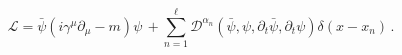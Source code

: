 \begin{equation}
\mathcal{L}=\bar{\psi}(i\gamma ^{\mu }\partial _{\mu }-m)\psi
\,+\sum_{n=1}^{\ell }\mathcal{D}^{\alpha _{n}}(\bar{\psi},\psi ,\partial _{t}%
\bar{\psi},\partial _{t}\psi )\delta (x-x_{n})\,.  \label{LF}
\end{equation}

